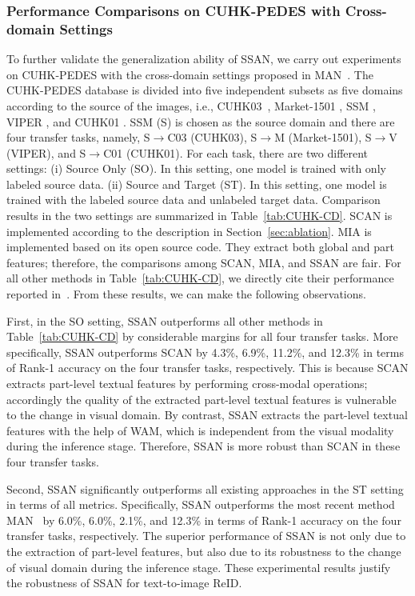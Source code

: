 \documentclass[journal]{IEEEtran}
\begin{document}
\subsubsection{Performance Comparisons on CUHK-PEDES with Cross-domain Settings}
To further validate the generalization ability of SSAN, we carry out experiments on CUHK-PEDES with the cross-domain settings proposed in MAN~\cite{jing2020cross}.
The CUHK-PEDES database is divided into five independent subsets as five domains according to the source of the images,
i.e., CUHK03~\cite{li2014deepreid}, Market-1501 \cite{zheng2015person}, SSM \cite{xiao2016end}, VIPER \cite{gray2007evaluating}, and CUHK01 \cite{li2012human}.
SSM (S) is chosen as the source domain and there are four transfer tasks, namely, S$\rightarrow$C03 (CUHK03), S$\rightarrow$M (Market-1501), S$\rightarrow$V (VIPER), and S$\rightarrow$C01 (CUHK01). For each task, there are two different settings: (i) Source Only (SO). In this setting, one model is trained with only labeled source data.
(ii) Source and Target (ST). In this setting, one model is trained with the labeled source data and unlabeled target data.
Comparison results in the two settings are summarized in Table~\ref{tab:CUHK-CD}.
SCAN is implemented according to the description in Section~\ref{sec:ablation}. MIA is implemented based on its open source code. They extract both global and part features; therefore, the comparisons among SCAN, MIA, and SSAN are fair.
For all other methods in Table~\ref{tab:CUHK-CD}, we directly cite their performance reported in~\cite{jing2020cross}.
From these results, we can make the following observations.

First, in the SO setting, SSAN outperforms all other methods in Table~\ref{tab:CUHK-CD} by considerable margins for all four transfer tasks.
More specifically, SSAN outperforms SCAN \cite{lee2018stacked} by 4.3\%, 6.9\%, 11.2\%, and 12.3\% in terms of Rank-1 accuracy on the four transfer tasks, respectively.
This is because SCAN extracts part-level textual features by performing cross-modal operations;
accordingly the quality of the extracted part-level textual features is vulnerable to the change in visual domain.
By contrast, SSAN extracts the part-level textual features with the help of WAM, which is independent from the visual modality during the inference stage.
Therefore, SSAN is more robust than SCAN in these four transfer tasks.

Second, SSAN significantly outperforms all existing approaches in the ST setting in terms of all metrics.
Specifically, SSAN outperforms the most recent method MAN~\cite{jing2020cross} by 6.0\%, 6.0\%, 2.1\%, and 12.3\% in terms of Rank-1 accuracy on the four transfer tasks, respectively.
The superior performance of SSAN is not only due to the extraction of part-level features, but also due to its robustness to the change of visual domain during the inference stage.
These experimental results justify the robustness of SSAN for text-to-image ReID.
\end{document}
